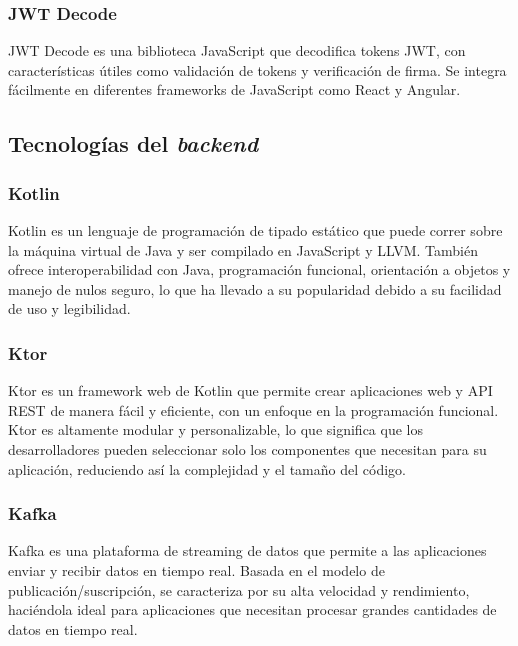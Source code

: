 \subsubsection{JWT Decode}

JWT Decode \citep{jwt-decode} es una biblioteca JavaScript que decodifica tokens JWT, con características útiles como validación de tokens y verificación de firma. Se integra fácilmente en diferentes frameworks de JavaScript como React y Angular.


\subsection{Tecnologías del \textit{backend}}


\subsubsection{Kotlin}

Kotlin \citep{kotlin} es un lenguaje de programación de tipado estático que puede correr sobre la máquina virtual de Java y ser compilado en JavaScript y LLVM. También ofrece interoperabilidad con Java, programación funcional, orientación a objetos y manejo de nulos seguro, lo que ha llevado a su popularidad debido a su facilidad de uso y legibilidad.


\subsubsection{Ktor}

Ktor \citep{ktor} es un framework web de Kotlin que permite crear aplicaciones web y API REST de manera fácil y eficiente, con un enfoque en la programación funcional. Ktor es altamente modular y personalizable, lo que significa que los desarrolladores pueden seleccionar solo los componentes que necesitan para su aplicación, reduciendo así la complejidad y el tamaño del código. 


\subsubsection{Kafka}

Kafka \citep{kafka} es una plataforma de streaming de datos que permite a las aplicaciones enviar y recibir datos en tiempo real. Basada en el modelo de publicación/suscripción, se caracteriza por su alta velocidad y rendimiento, haciéndola ideal para aplicaciones que necesitan procesar grandes cantidades de datos en tiempo real.


